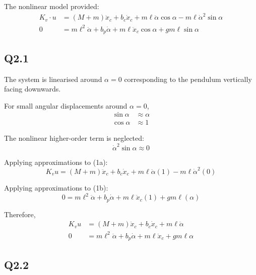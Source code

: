 \documentclass[11pt,a4paper]{article}
\begin{document}
The nonlinear model provided:
\begin{align}
	K_{v} \cdot u &= \left( M + m \right) \ddot{x}_{c} + b_{c} \dot{x}_{c}
	+ m \ell \ddot{\alpha} \cos\alpha
	- m \ell \dot{\alpha}^{2} \sin\alpha \tag{1a} \\
	0 &= m \ell^{2} \ddot{\alpha} + b_{p} \dot{\alpha}
	+ m \ell \ddot{x}_{c} \cos\alpha + g m \ell \sin\alpha \tag{1b}
\end{align}

\subsection*{Q2.1}

The system is linearised around $\alpha = 0$ corresponding to the pendulum
vertically facing downwards.

For small angular displacements around $\alpha = 0$,
\begin{align*}
	\sin\alpha &\approx \alpha \\
	\cos\alpha &\approx 1
\end{align*}

The nonlinear higher-order term is neglected:
\begin{equation*}
	\dot{\alpha}^{2} \sin\alpha \approx 0
\end{equation*}

Applying approximations to (1a):
\begin{equation*}
    K_{v} u = \left( M + m \right) \ddot{x}_{c} + b_{c}\dot{x}_{c} 
	+ m\ell\ddot{\alpha}(1) - m\ell\dot{\alpha}^{2}(0)
\end{equation*}

Applying approximations to (1b):
\begin{equation*}
    0 = m\ell^{2}\ddot{\alpha} + b_{p}\dot{\alpha}
    + m\ell\ddot{x}_{c}(1) + gm\ell(\alpha)
\end{equation*}

Therefore,
\begin{align}
    K_{v}u &= \left( M+m \right)\ddot{x}_{c} + b_{c}\dot{x}_{c}
    + m\ell\ddot{\alpha} \tag{2a} \\
    0 &= m\ell^{2}\ddot{\alpha} + b_{p}\dot{\alpha}
    + m\ell\ddot{x}_{c} + gm\ell\alpha \tag{2b}
\end{align}

\subsection*{Q2.2}
\end{document}
